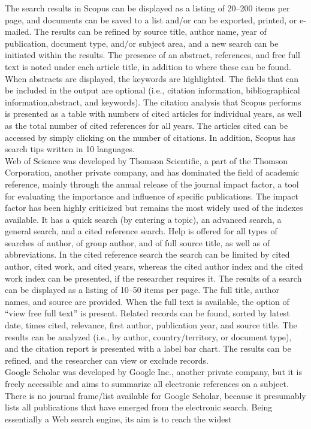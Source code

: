 \begin{enumerate}
	The search results in Scopus can be displayed as a listing of 20–200 items per page, and documents can be saved to a list and/or can be exported, printed, or
	e-mailed. The results can be refined by source title, author name, year of publication, document type, and/or subject area, and a new search can be initiated within the results. The presence of an abstract, references, and free full text is noted under each article title, in addition to where these can be found. When abstracts are displayed, the keywords are highlighted. The fields that can be included in the output are optional (i.e., citation information, bibliographical information,abstract, and keywords). The citation analysis that Scopus performs is presented as a table with numbers of cited articles for individual years, as well as the total number of cited references for all years. The articles cited can be accessed by simply clicking on the number of citations. In addition, Scopus has search tips written in 10 languages.\\
	Web of Science was developed by Thomson Scientific, a part of the Thomson Corporation, another private company, and has dominated the field of academic reference, mainly through the annual release of the journal impact factor, a tool for evaluating the importance and influence of specific publications. The
	impact factor has been highly criticized but remains the most widely used of the indexes available. It has a quick search (by entering a topic), an advanced search, a general search, and a cited reference search. Help is offered for all types of searches of author, of group author, and of full source title, as well as of abbreviations. In the cited reference search the search can be limited by cited author, cited work, and cited years, whereas the cited author index and the cited work index can be presented, if the researcher requires it. The results of a search can be displayed as a listing of 10–50 items per page. The full title, author names, and source are provided. When the full text is available, the option of “view free full text” is present. Related records
	can be found, sorted by latest date, times cited, relevance, first author, publication year, and source title. The results can be analyzed (i.e., by author, country/territory, or document type), and the citation report is
	presented with a label bar chart. The results can be refined, and the researcher can view or exclude records.\\
	Google Scholar was developed by Google Inc., another private company, but it is freely accessible and aims to summarize all electronic references on a subject. There is no journal frame/list available for Google Scholar, because it presumably lists all publications that 	have emerged from the electronic search. Being essentially a Web search engine, its aim is to reach the widest

\end{enumerate}
